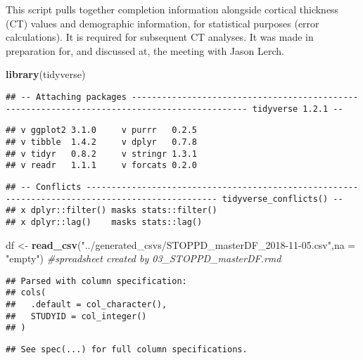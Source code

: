\documentclass[]{article}
\newenvironment{Shaded}{\begin{snugshade}}{\end{snugshade}}
\newcommand{\KeywordTok}[1]{\textcolor[rgb]{0.13,0.29,0.53}{\textbf{#1}}}
\newcommand{\DataTypeTok}[1]{\textcolor[rgb]{0.13,0.29,0.53}{#1}}
\newcommand{\StringTok}[1]{\textcolor[rgb]{0.31,0.60,0.02}{#1}}
\newcommand{\CommentTok}[1]{\textcolor[rgb]{0.56,0.35,0.01}{\textit{#1}}}
\newcommand{\NormalTok}[1]{#1}
\theoremstyle{definition}
\theoremstyle{definition}
\theoremstyle{definition}
\theoremstyle{remark}
\begin{document}
This script pulls together completion information alongside cortical
thickness (CT) values and demographic information, for statistical
purposes (error calculations). It is required for subsequent CT
analyses. It was made in preparation for, and discussed at, the meeting
with Jason Lerch.

\begin{Shaded}
\begin{Highlighting}[]
\KeywordTok{library}\NormalTok{(tidyverse)}
\end{Highlighting}
\end{Shaded}

\begin{verbatim}
## -- Attaching packages --------------------------------------------------------------------------------------------- tidyverse 1.2.1 --
\end{verbatim}

\begin{verbatim}
## v ggplot2 3.1.0     v purrr   0.2.5
## v tibble  1.4.2     v dplyr   0.7.8
## v tidyr   0.8.2     v stringr 1.3.1
## v readr   1.1.1     v forcats 0.2.0
\end{verbatim}

\begin{verbatim}
## -- Conflicts ------------------------------------------------------------------------------------------------ tidyverse_conflicts() --
## x dplyr::filter() masks stats::filter()
## x dplyr::lag()    masks stats::lag()
\end{verbatim}

\begin{Shaded}
\begin{Highlighting}[]
\NormalTok{df <-}\StringTok{ }\KeywordTok{read_csv}\NormalTok{(}\StringTok{"../generated_csvs/STOPPD_masterDF_2018-11-05.csv"}\NormalTok{,}\DataTypeTok{na =} \StringTok{"empty"}\NormalTok{) }\CommentTok{#spreadsheet created by 03_STOPPD_masterDF.rmd}
\end{Highlighting}
\end{Shaded}

\begin{verbatim}
## Parsed with column specification:
## cols(
##   .default = col_character(),
##   STUDYID = col_integer()
## )
\end{verbatim}

\begin{verbatim}
## See spec(...) for full column specifications.
\end{verbatim}
\end{document}
